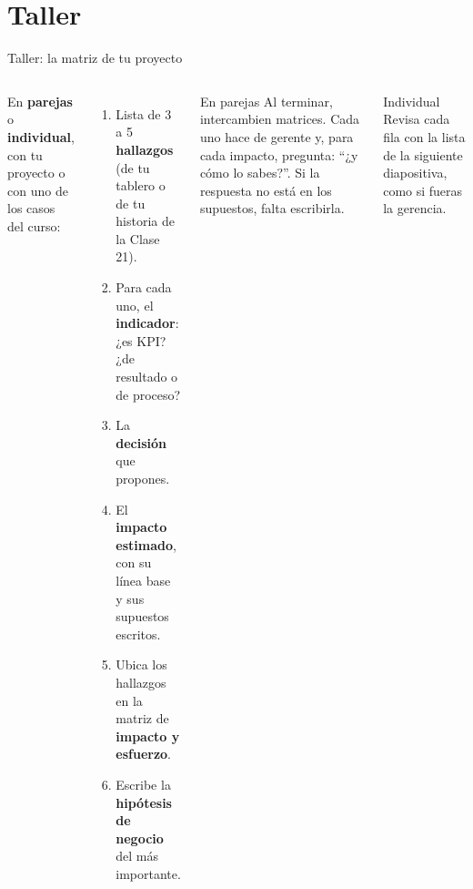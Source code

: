 \documentclass[aspectratio=169,11pt]{beamer}
\begin{document}
\section{Taller}
\begin{frame}[t]{Taller: la matriz de tu proyecto}
  \begin{columns}[T,onlytextwidth]
    \small En \textbf{parejas} o \textbf{individual}, con tu proyecto o con
    uno de los casos del curso:
    \begin{enumerate}
      \footnotesize
      \item Lista de 3 a 5 \textbf{hallazgos} (de tu tablero o de tu
        historia de la Clase 21).
      \item Para cada uno, el \textbf{indicador}: ¿es KPI? ¿de resultado o
        de proceso?
      \item La \textbf{decisión} que propones.
      \item El \textbf{impacto estimado}, con su línea base y sus
        supuestos escritos.
      \item Ubica los hallazgos en la matriz de \textbf{impacto y
        esfuerzo}.
      \item Escribe la \textbf{hipótesis de negocio} del más importante.
    \end{enumerate}
    \begin{block}{En parejas}
      \footnotesize Al terminar, intercambien matrices. Cada uno hace de
      gerente y, para cada impacto, pregunta: ``¿y cómo lo sabes?''. Si la
      respuesta no está en los supuestos, falta escribirla.
    \end{block}
    \begin{block}{Individual}
      \footnotesize Revisa cada fila con la lista de la siguiente
      diapositiva, como si fueras la gerencia.
    \end{block}
  \end{columns}
\end{frame}
\end{document}
